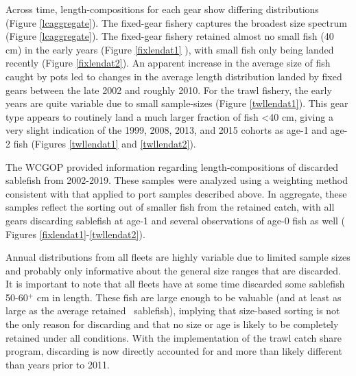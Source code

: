 \documentclass[11pt,
  english,
  a4paper,
]{article}
\begin{document}
\leavevmode\tagmcend\tagstructend\par


Across time, length-compositions for each gear show differing distributions (Figure \ref{lcaggregate}). The fixed-gear fishery captures the broadest size spectrum (Figure \ref{lcaggregate}). The fixed-gear fishery retained almost no small fish (40 cm) in the early years (Figure \ref{fixlendat1} ), with small fish only being landed recently (Figure \ref{fixlendat2}). An apparent increase in the average size of fish caught by pots led to changes in the average length distribution landed by fixed gears between the late 2002 and roughly 2010. For the trawl fishery, the early years are quite variable due to small sample-sizes (Figure \ref{twllendat1}). This gear type appears to routinely land a much larger fraction of fish \textless40 cm, giving a very slight indication of the 1999, 2008, 2013, and 2015 cohorts as age-1 and age-2 fish (Figures \ref{twllendat1} and \ref{twllendat2}).

\leavevmode\tagmcend\tagstructend\par


The WCGOP provided information regarding length-compositions of discarded sablefish from 2002-2019. These samples were analyzed using a weighting method consistent with that applied to port samples described above. In aggregate, these samples reflect the sorting out of smaller fish from the retained catch, with all gears discarding sablefish at age-1 and several observations of age-0 fish as well ( Figures \ref{fixlendat1}-\ref{twllendat2}).

\leavevmode\tagmcend\tagstructend\par


Annual distributions from all fleets are highly variable due to limited sample sizes and probably only informative about the general size ranges that are discarded. It is important to note that all fleets have at some time discarded some sablefish 50-60{\(^+\)\leavevmode\tagmcend\tagstructend} cm in length. These fish are large enough to be valuable (and at least as large as the average retained ~sablefish), implying that size-based sorting is not the only reason for discarding and that no size or age is likely to be completely retained under all conditions. With the implementation of the trawl catch share program, discarding is now directly accounted for and more than likely different than years prior to 2011.
\end{document}
